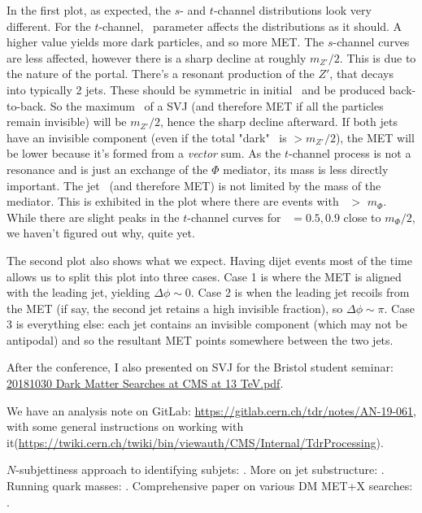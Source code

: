 In the first plot, as expected, the $s$- and $t$-channel distributions look very different. For the $t$-channel, \rinv\ parameter affects the distributions as it should. A higher value yields more dark particles, and so more MET. The $s$-channel curves are less affected, however there is a sharp decline at roughly $m_{Z'}/2$. This is due to the nature of the portal. There's a resonant production of the $Z'$, that decays into typically 2 jets. These should be symmetric in initial \pT\ and be produced back-to-back. So the maximum \pT\ of a SVJ (and therefore MET if all the particles remain invisible) will be $m_{Z'}/2$, hence the sharp decline afterward. If both jets have an invisible component (even if the total "dark" \pT\ is $> m_{Z'}/2$), the MET will be lower because it's formed from a \emph{vector} sum. As the $t$-channel process is not a resonance and is just an exchange of the $\Phi$ mediator, its mass is less directly important. The jet \pT\ (and therefore MET) is not limited by the mass of the mediator. This is exhibited in the plot where there are events with \ptmiss\ $>$ $m_{\Phi}$. While there are slight peaks in the $t$-channel curves for \rinv\ $= 0.5, 0.9$ close to $m_{\Phi}/2$, we haven't figured out why, quite yet.

The second plot also shows what we expect. Having dijet events most of the time allows us to split this plot into three cases. Case 1 is where the MET is aligned with the leading jet, yielding $\Delta\phi \sim 0$. Case 2 is when the leading jet recoils from the MET (if say, the second jet retains a high invisible fraction), so $\Delta\phi \sim \pi$. Case 3 is everything else: each jet contains an invisible component (which may not be antipodal) and so the resultant MET points somewhere between the two jets.

After the conference, I also presented on SVJ for the Bristol student seminar: \href{run:./sec35/20181030 Dark Matter Searches at CMS at 13 TeV.pdf}{20181030 Dark Matter Searches at CMS at 13 TeV.pdf}.

We have an analysis note on GitLab: \url{https://gitlab.cern.ch/tdr/notes/AN-19-061}, with some general instructions on working with it(\url{https://twiki.cern.ch/twiki/bin/viewauth/CMS/Internal/TdrProcessing}).

$N$-subjettiness approach to identifying subjets: \cite{Thaler:2010tr}.
More on jet substructure: \cite{Freytsis:2014hpa}.
Running quark masses: \cite{Bednyakov:2016onn}.
Comprehensive paper on various DM MET+X searches: \cite{Aaboud:2019yqu}.
